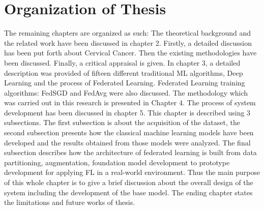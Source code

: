 \section{Organization of Thesis}

The remaining chapters are organized as such: The theoretical background and the related work have been discussed in chapter 2. Firstly, a detailed discussion has been put forth about Cervical Cancer. Then the existing methodologies have been discussed. Finally, a critical appraisal is given.   
In chapter 3, a detailed description was provided of fifteen different traditional ML algorithms, Deep Learning and the process of Federated Learning. Federated Learning training algorithms: FedSGD and FedAvg were also discussed. The methodology which was carried out in this research is presented in Chapter 4. The process of system development has been discussed in chapter 5. This chapter is described using 3 subsections. The first subsection is about the acquisition of the dataset, the second subsection presents how the classical machine learning models have been developed and the results obtained from those models were analyzed. The final subsection describes how the architecture of federated learning is built from data partitioning, augmentation, foundation model development to prototype development for applying FL in a real-world environment. Thus the main purpose of this whole chapter is to give a brief discussion about the overall design of the system including the development of the base model. The ending chapter states the limitations and future works of thesis.
